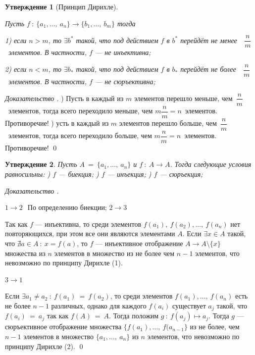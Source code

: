 \documentclass[12pt,oneside]{article}
\newtheorem{statement}{Утверждение}[section]
\theoremstyle{definition}
\newenvironment{ourproof}[1]{\textit{Доказательство #1.}}{\qed}
\begin{document}
\begin{statement}[Принцип Дирихле]\label{dir}

Пусть $f\ :\ \{a_1,\dots ,\ a_n\} \longrightarrow \{b_1,\dots ,\ b_m\}$ тогда

1) если $n>m$, то $\exists b^*$ такой, что под действием $f$ в $b^*$ перейдёт не менее\ \ $\dfrac nm$\ элементов. В частности, $f$ --- не инъективна;

2) если $n<m$, то $\exists b_*$ такой, что под действием $f$ в $b_*$ перейдёт не более\ \ $\dfrac nm$\ элементов. В частности, $f$ --- не сюръективна;
\end{statement}
\begin{ourproof}{}
) Пусть в каждый из $m$ элементов перешло меньше, чем\ $\dfrac nm$\ элементов, тогда всего переходило меньше, чем $m\dfrac nm=n$\ элементов. Противоречие!
) усть в каждый из $m$ элементов перешло больше, чем\ $\dfrac nm$\ элементов, тогда всего переходило больше, чем $m\dfrac nm=n$\ элементов. Противоречие!
\end{ourproof} 


\begin{statement}\label{A_to_A}
Пусть $A\ =\ \{a_1,\dots ,\ a_n\}$ и $f\ :\ A \longrightarrow A$. Тогда следующие условия равносильны:
) $f$ --- биекция;
) $f$ --- инъекция;
) $f$ --- сюръекция;
\end{statement}
\begin{ourproof}{}

$1 \rightarrow 2\ $\ По определению биекции;
\newline
$2 \rightarrow 3\ $

Так как $f$ --- инъективна, то среди элементов $f(a_1),\ f(a_2),\dots ,\ f(a_n)$ нет повторяющихся, при этом все они являются элементами $A$. Если $\exists x\in A$ такой, что $\nexists a\in A\ :\ x=f(a)$, то $f$ --- инъективное отображение $A \longrightarrow A\setminus\{x\}$ множества из $n$ элементов в множество из не более чем $n-1$ элементов, что невозможно по принципу Дирихле (1).

$3 \rightarrow 1$ 

Если $\exists a_1 \neq a_2\ :\ f(a_1)\ =\ f(a_2)$, то среди элементов $f(a_1),\dots ,\ f(a_n)$ есть не более $n-1$ различных, однако для каждого $f(a_i)$ существует $a_j$ такой, что $f(a_i)\ =\ a_j$ так как $f(A)\ =\ A$. Тогда положим $g\ :\ f(a_j) \longmapsto a_j$. Тогда $g$ ---сюръективное отображение множества $\{f(a_1),\dots ,\ f(a_{n-1}\}$ из не более, чем $n-1$ элементов в множество $\{a_1,\dots ,\ a_n\}$ из $n$ элементов, что невозможно по принципу Дирихле (2).
\end{ourproof}
\end{document}
